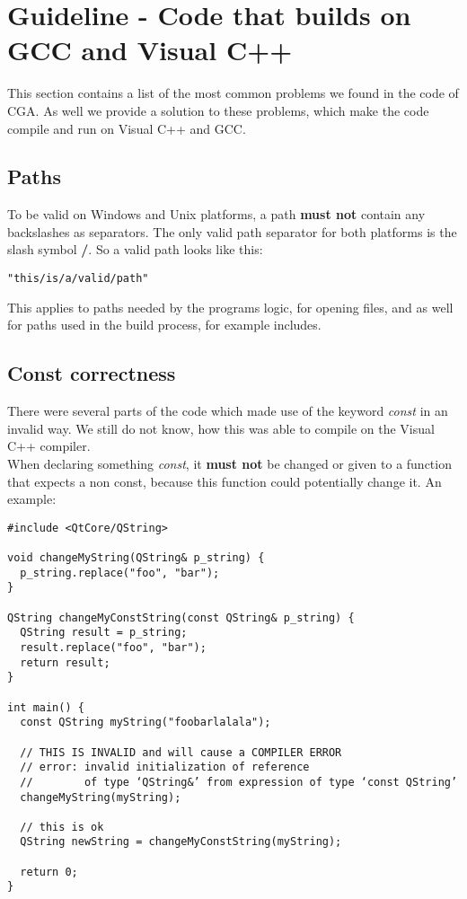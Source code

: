 
\section{Guideline - Code that builds on GCC and Visual C++} This section contains a list of the most common problems we found in the code of CGA. As well we provide a solution to these problems, which make the code compile and run on Visual C++ and GCC.

\subsection{Paths} To be valid on Windows and Unix platforms, a path \textbf{must not} contain any backslashes as separators. The only valid path separator for both platforms is the slash symbol \textbf{/}. So a valid path looks like this: 
\begin{verbatim}
"this/is/a/valid/path" 
\end{verbatim}
This applies to paths needed by the programs logic, for opening files, and as well for paths used in the build process, for example includes.

\subsection{Const correctness} There were several parts of the code which made use of the keyword \emph{const} in an invalid way. We still do not know, how this was able to compile on the Visual C++ compiler.\\

When declaring something \emph{const}, it \textbf{must not} be changed or given to a function that expects a non const, because this function could potentially change it. An example:
\begin{verbatim}
#include <QtCore/QString>

void changeMyString(QString& p_string) {
  p_string.replace("foo", "bar");
}

QString changeMyConstString(const QString& p_string) {
  QString result = p_string;
  result.replace("foo", "bar");
  return result;
}

int main() {
  const QString myString("foobarlalala");

  // THIS IS INVALID and will cause a COMPILER ERROR
  // error: invalid initialization of reference 
  //        of type ‘QString&’ from expression of type ‘const QString’
  changeMyString(myString);

  // this is ok
  QString newString = changeMyConstString(myString);

  return 0;
}
\end{verbatim}

